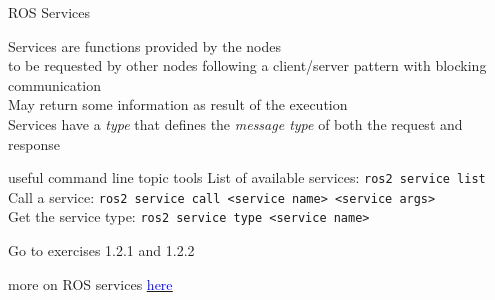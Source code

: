 \documentclass[compress]{beamer}
\newcommand{\link}[2]{\href{#1}{\underline{\textcolor{blue}{#2}}}}
\begin{document}
\begin{frame}{ROS Services}
 
 \footnotesize
 
 Services are functions provided by the nodes\\
 {\tiny to be requested by other nodes following a client/server pattern with blocking communication}\\
 
 
 May return some information as result of the execution\\ 
 
 Services have a \textit{type} that defines the \textit{message type} of both the request and response
 
 \vspace{.5cm}
 
   \begin{block}{{\tiny useful command line topic tools}}\tiny
    List of available services: \texttt{ros2 service list}\\
    Call a service: \texttt{ros2 service call \textless service name\textgreater\ \textless service args\textgreater\ }\\
    Get the service type: \texttt{ros2 service type \textless service name\textgreater\ }
   
  \end{block}

{\tiny Go to exercises 1.2.1 and 1.2.2}  
 
 \vfill
{\fontsize{4}{4.8}\selectfont more on ROS services \link{https://docs.ros.org/en/foxy/Tutorials/Beginner-CLI-Tools/Understanding-ROS2-Services/Understanding-ROS2-Services.html}{here}}
 
\end{frame}
\end{document}
